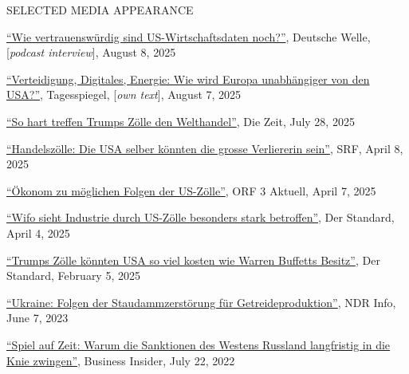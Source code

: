 \documentclass{article}
\begin{document}
\begin{minipage}[t]{0.12\textwidth}
    {\selectfont SELECTED MEDIA \mbox APPEARANCE} \\
\end{minipage}
\hspace{5mm}
\begin{minipage}[t]{0.8\textwidth}
  \href{https://www.dw.com/de/nach-rauswurf-wie-vertrauenswürdig-sind-us-wirtschaftsdaten-noch/audio-73561036}{``Wie vertrauenswürdig sind US-Wirtschaftsdaten noch?''}, Deutsche Welle, [\textit{podcast interview}], August 8, 2025 \par
  \href{https://www.tagesspiegel.de/internationales/verteidigung-digitales-energie-wie-wird-europa-unabhangiger-von-den-usa-14138207.html}{``Verteidigung, Digitales, Energie: Wie wird Europa unabhängiger von den USA?''}, Tagesspiegel, [\textit{own text}], August 7, 2025 \par
  \href{https://www.zeit.de/wirtschaft/2025-07/us-zoelle-handelsstreit-auswirkungen-usa}{``So hart treffen Trumps Zölle den Welthandel''}, Die Zeit, July 28, 2025 \par
  \href{https://www.srf.ch/audio/echo-der-zeit/handelszoelle-die-usa-selber-koennten-die-grosse-verliererin-sein?partId=77nj5adJX0fKQd92D0cUOK53Vmw}{``Handelszölle: Die USA selber könnten die grosse Verliererin sein''}, SRF, April 8, 2025 \par
  \href{https://on.orf.at/video/14270682/15857146/oekonom-zu-moeglichen-folgen-der-us-zoelle}{``Ökonom zu möglichen Folgen der US-Zölle''}, ORF 3 Aktuell, April 7, 2025 \par
    \href{https://www.derstandard.at/story/3000000264273/trump-stellt-china-zollnachlass-f252r-entgegenkommen-bei-tiktok-verkauf-in-aussicht}{``Wifo sieht Industrie durch US-Zölle besonders stark betroffen''}, Der Standard, April 4, 2025 \par 
    \href{https://www.derstandard.de/story/3000000256055/trumps-zoelle-koennten-usa-so-viel-kosten-wie-warren-buffett-besitzt}{``Trumps Zölle könnten USA so viel kosten wie Warren Buffetts Besitz''}, Der Standard, February 5, 2025 \par
    \href{https://www.ndr.de/nachrichten/info/Wirtschaft-Folgen-der-Staudammzerstoerung-fuer-Getreideproduktion,audio1398696.html}{``Ukraine: Folgen der Staudammzerstörung für Getreideproduktion''}, NDR Info, June 7, 2023 \par
     \href{https://www.businessinsider.de/politik/welt/spiel-auf-zeit-warum-die-bundesregierung-und-experten-glauben-dass-die-sanktionen-des-westens-russland-langfristig-in-die-knie-zwingen-werden/}{``Spiel auf Zeit: Warum die Sanktionen des Westens Russland langfristig in die Knie zwingen''}, Business Insider, July 22, 2022 \par

\end{minipage}
\end{document}
